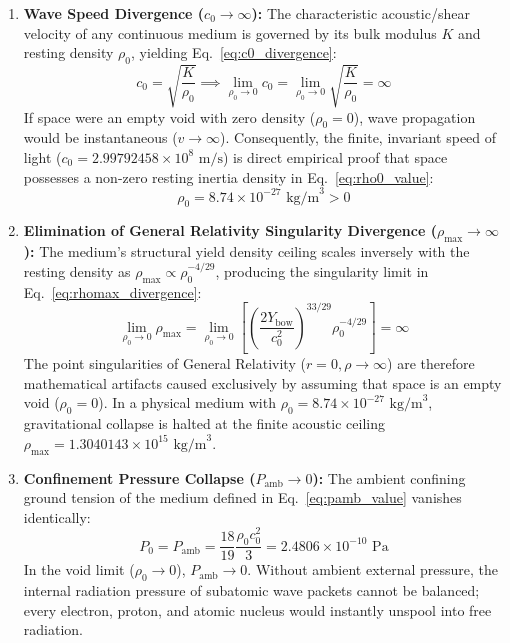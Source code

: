 \documentclass[11pt,a4paper]{article}
\begin{document}
\begin{enumerate}
    \item \textbf{Wave Speed Divergence ($c_0 \to \infty$):} The characteristic acoustic/shear velocity of any continuous medium is governed by its bulk modulus $K$ and resting density $\rho_0$, yielding Eq.~\eqref{eq:c0_divergence}:
    \begin{equation}
    c_0 = \sqrt{\frac{K}{\rho_0}} \implies \lim_{\rho_0 \to 0} c_0 = \lim_{\rho_0 \to 0} \sqrt{\frac{K}{\rho_0}} = \infty
    \label{eq:c0_divergence}
    \end{equation}
    If space were an empty void with zero density ($\rho_0 = 0$), wave propagation would be instantaneous ($v \to \infty$). Consequently, the finite, invariant speed of light ($c_0 = 2.99792458 \times 10^8\text{ m/s}$) is direct empirical proof that space possesses a non-zero resting inertia density in Eq.~\eqref{eq:rho0_value}:
    \begin{equation}
    \rho_0 = 8.74 \times 10^{-27}\text{ kg/m}^3 > 0
    \label{eq:rho0_value}
    \end{equation}

    \item \textbf{Elimination of General Relativity Singularity Divergence ($\rho_{\max} \to \infty$):} The medium's structural yield density ceiling scales inversely with the resting density as $\rho_{\max} \propto \rho_0^{-4/29}$, producing the singularity limit in Eq.~\eqref{eq:rhomax_divergence}:
    \begin{equation}
    \lim_{\rho_0 \to 0} \rho_{\max} = \lim_{\rho_0 \to 0} \left[ \left( \frac{2 Y_{\text{bow}}}{c_0^2} \right)^{33/29} \rho_0^{-4/29} \right] = \infty
    \label{eq:rhomax_divergence}
    \end{equation}
    The point singularities of General Relativity ($r = 0, \rho \to \infty$) are therefore mathematical artifacts caused exclusively by assuming that space is an empty void ($\rho_0 = 0$). In a physical medium with $\rho_0 = 8.74 \times 10^{-27}\text{ kg/m}^3$, gravitational collapse is halted at the finite acoustic ceiling $\rho_{\max} = 1.3040143 \times 10^{15}\text{ kg/m}^3$.

    \item \textbf{Confinement Pressure Collapse ($P_{\text{amb}} \to 0$):} The ambient confining ground tension of the medium defined in Eq.~\eqref{eq:pamb_value} vanishes identically:
    \begin{equation}
    P_0 = P_{\text{amb}} = \frac{18}{19} \frac{\rho_0 c_0^2}{3} = 2.4806 \times 10^{-10}\text{ Pa}
    \label{eq:pamb_value}
    \end{equation}
    In the void limit ($\rho_0 \to 0$), $P_{\text{amb}} \to 0$. Without ambient external pressure, the internal radiation pressure of subatomic wave packets cannot be balanced; every electron, proton, and atomic nucleus would instantly unspool into free radiation.
\end{enumerate}
\end{document}
